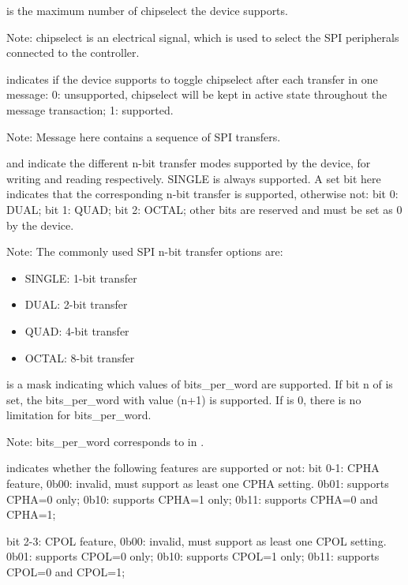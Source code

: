  is the maximum number of chipselect the device supports.

Note: chipselect is an electrical signal, which is used to select the SPI peripherals connected
to the controller.

 indicates if the device supports to toggle chipselect
after each transfer in one message:
        0: unsupported, chipselect will be kept in active state throughout the message transaction;
        1: supported.

Note: Message here contains a sequence of SPI transfers.

 and  indicate the different n-bit transfer
modes supported by the device, for writing and reading respectively. SINGLE is always supported.
A set bit here indicates that the corresponding n-bit transfer is supported, otherwise not:
        bit 0: DUAL;
        bit 1: QUAD;
        bit 2: OCTAL;
        other bits are reserved and must be set as 0 by the device.

Note: The commonly used SPI n-bit transfer options are:
\begin{itemize}
\item SINGLE: 1-bit transfer
\item DUAL: 2-bit transfer
\item QUAD: 4-bit transfer
\item OCTAL: 8-bit transfer
\end{itemize}

 is a mask indicating which values of bits_per_word are supported.
If bit n of  is set, the bits_per_word with value (n+1) is supported.
If  is 0, there is no limitation for bits_per_word.

Note: bits_per_word corresponds to  in .

 indicates whether the following features are supported or not:
        bit 0-1: CPHA feature,
            0b00: invalid, must support as least one CPHA setting.
            0b01: supports CPHA=0 only;
            0b10: supports CPHA=1 only;
            0b11: supports CPHA=0 and CPHA=1;

        bit 2-3: CPOL feature,
            0b00: invalid, must support as least one CPOL setting.
            0b01: supports CPOL=0 only;
            0b10: supports CPOL=1 only;
            0b11: supports CPOL=0 and CPOL=1;

